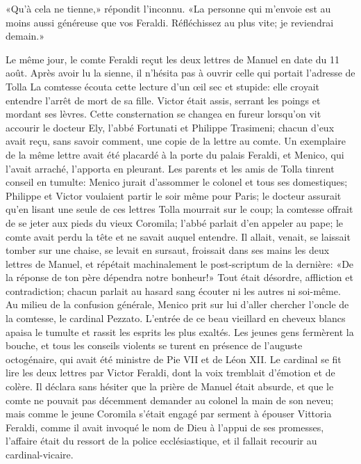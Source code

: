 «Qu'à cela ne tienne,» répondit l'inconnu. «La personne qui m'envoie est au moins aussi généreuse que vos Feraldi. Réfléchissez au plus vite; je reviendrai demain.»

Le même jour, le comte Feraldi reçut les deux lettres de Manuel en date du 11 août. Après avoir lu la sienne, il n'hésita pas à ouvrir celle qui portait l'adresse de Tolla La comtesse écouta cette lecture d'un \oe{}il sec et stupide: elle croyait entendre l'arrêt de mort de sa fille. Victor était assis, serrant les poings et mordant ses lèvres. Cette consternation se changea en fureur lorsqu'on vit accourir le docteur Ely, l'abbé Fortunati et Philippe Trasimeni; chacun d'eux avait reçu, sans savoir comment, une copie de la lettre au comte. Un exemplaire de la même lettre avait été placardé à la porte du palais Feraldi, et Menico, qui l'avait arraché, l'apporta en pleurant. Les parents et les amis de Tolla tinrent conseil en tumulte: Menico jurait d'assommer le colonel et tous ses domestiques; Philippe et Victor voulaient partir le soir même pour Paris; le docteur assurait qu'en lisant une seule de ces lettres Tolla mourrait sur le coup; la comtesse offrait de se jeter aux pieds du vieux Coromila; l'abbé parlait d'en appeler au pape; le comte avait perdu la tête et ne savait auquel entendre. Il allait, venait, se laissait tomber sur une chaise, se levait en sursaut, froissait dans ses mains les deux lettres de Manuel, et répétait machinalement le post-scriptum de la dernière: «De la réponse de ton père dépendra notre bonheur!» Tout était désordre, affliction et contradiction; chacun parlait au hasard sang écouter ni les autres ni soi-même. Au milieu de la confusion générale, Menico prit sur lui d'aller chercher l'oncle de la comtesse, le cardinal Pezzato. L'entrée de ce beau vieillard en cheveux blancs apaisa le tumulte et rassit les esprits les plus exaltés. Les jeunes gens fermèrent la bouche, et tous les conseils violents se turent en présence de l'auguste octogénaire, qui avait été ministre de Pie VII et de Léon XII. Le cardinal se fit lire les deux lettres par Victor Feraldi, dont la voix tremblait d'émotion et de colère. Il déclara sans hésiter que la prière de Manuel était absurde, et que le comte ne pouvait pas décemment demander au colonel la main de son neveu; mais comme le jeune Coromila s'était engagé par serment à épouser Vittoria Feraldi, comme il avait invoqué le nom de Dieu à l'appui de ses promesses, l'affaire était du ressort de la police ecclésiastique, et il fallait recourir au cardinal-vicaire.

